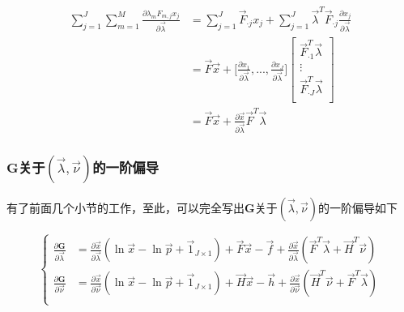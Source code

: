 \begin{equation}
    \begin{aligned}
        \sum_{j=1}^J\sum_{m=1}^M \frac{\partial \lambda_mF_{m,j}x_j}{\partial\vec{\lambda}} & = \sum_{j=1}^J\vec{F}_{\cdot j}x_j + \sum_{j=1}^J\vec{\lambda}^T\vec{F}_{\cdot j}\frac{\partial x_j}{\partial \vec{\lambda}}                                    \\
                                                                                            & = \vec{F}\vec{x} + \Big[\frac{\partial x_1}{\partial \vec{\lambda}},...,\frac{\partial x_J}{\partial \vec{\lambda}}\Big]\left[\begin{aligned}
                \vec{F}_{\cdot 1}^T\vec{\lambda}    \\
                \vdots \\
                \vec{F}_{\cdot J}^T\vec{\lambda}    \\
            \end{aligned}\right] \\
            & = \vec{F}\vec{x} + \frac{\partial \vec{x}}{\partial \vec{\lambda}}\vec{F}^T\vec{\lambda}
    \end{aligned}
\end{equation}

\subsubsection{$\mathbf{G}$关于$(\vec{\lambda}, \vec{\nu})$的一阶偏导}
有了前面几个小节的工作，至此，可以完全写出$\mathbf{G}$关于$(\vec{\lambda}, \vec{\nu})$的一阶偏导如下

\begin{equation}
    \left\{
    \begin{aligned}
        \frac{\partial \mathbf{G}}{\partial\vec{\lambda}} & = \frac{\partial \vec{x}}{\partial \vec{\lambda}}(\ln\vec{x}-\ln\vec{p} +\vec{1}_{J\times 1}) + \vec{F}\vec{x} - \vec{f} + \frac{\partial \vec{x}}{\partial\vec{\lambda}}(\vec{F}^T\vec{\lambda} + \vec{H}^T\vec{\nu}) \\
        \frac{\partial \mathbf{G}}{\partial\vec{\nu}}     & = \frac{\partial \vec{x}}{\partial \vec{\nu}}(\ln\vec{x}-\ln\vec{p} +\vec{1}_{J\times 1}) + \vec{H}\vec{x} - \vec{h} + \frac{\partial \vec{x}}{\partial\vec{\nu}}(\vec{H}^T\vec{\nu} +\vec{F}^T\vec{\lambda})          \\
    \end{aligned}
    \right.
\end{equation}